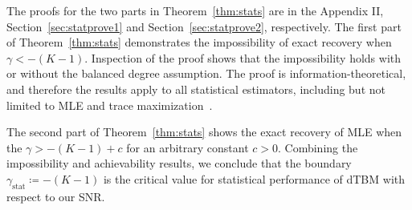 \documentclass[lettersize,onecolumn,journal]{IEEEtran}
\theoremstyle{definition}
\newtheorem{thm}{Theorem}
\theoremstyle{definition}
\begin{document}
{The proofs for the two parts in Theorem~\ref{thm:stats} are in the Appendix II, Section~\ref{sec:statprove1} and Section~\ref{sec:statprove2}, respectively. The first part of Theorem~\ref{thm:stats} demonstrates the impossibility of exact recovery when $\gamma < -(K-1)$. Inspection of the proof shows that the impossibility holds with or without the balanced degree assumption. %
The proof is information-theoretical, and therefore the results apply to all statistical estimators, including but not limited to MLE and trace maximization~\citep{ghoshdastidar2017uniform}. 

The second part of Theorem~\ref{thm:stats} shows the exact recovery of MLE when the $\gamma>-(K-1)+c$ for an arbitrary constant $c>0$. Combining the impossibility and achievability results, we conclude that the boundary $\gamma_{\text{stat}} \coloneqq -(K-1)$ is the critical value for statistical performance of dTBM with respect to our SNR.
}




\end{document}

